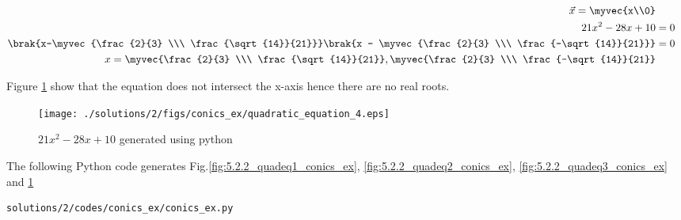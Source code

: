 \begin{enumerate}
\begin{align}
\vec{x} = \myvec{x\\0}\\
21x^2-28x+10 &= 0 \\
\brak{x-\myvec{\frac{2}{3} \\\  \frac{\sqrt{14}}{21}}}\brak{x - \myvec{\frac{2}{3} \\\  \frac{-\sqrt{14}}{21}}} &= 0 \\
x = \myvec{\frac{2}{3} \\\  \frac{\sqrt{14}}{21}}, \myvec{\frac{2}{3} \\\  \frac{-\sqrt{14}}{21}}
\end{align}

Figure \ref{fig:5.2.2_quadeq4_conics_ex} show that the equation does not intersect the x-axis hence there are no real roots.

\begin{figure}[!ht]
\centering
\texttt{[image: ./solutions/2/figs/conics\_ex/quadratic\_equation\_4.eps]}
\caption{$21x^2-28x+10$ generated using python}
\label{fig:5.2.2_quadeq4_conics_ex}
\end{figure} 

The  following Python code generates Fig.\ref{fig:5.2.2_quadeq1_conics_ex}, \ref{fig:5.2.2_quadeq2_conics_ex}, \ref{fig:5.2.2_quadeq3_conics_ex} and \ref{fig:5.2.2_quadeq4_conics_ex} 

\begin{lstlisting}
solutions/2/codes/conics_ex/conics_ex.py
\end{lstlisting}
\end{enumerate}
